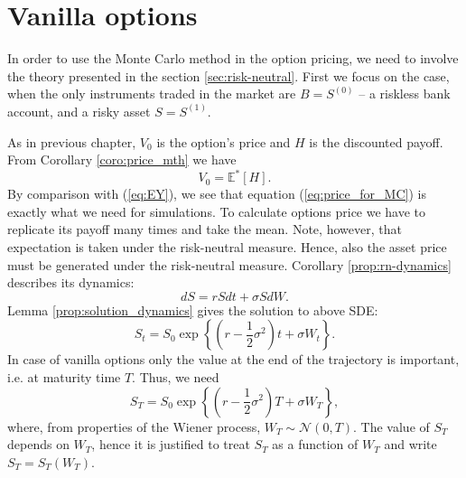 \documentclass[a4paper,11pt, twoside]{book}
\theoremstyle{definition}
\theoremstyle{remark}
\def\Em{{\mathbb{E}^*}}
\begin{document}
\section{Vanilla options}
\label{sec:pricing_vanilla}

In order to use the Monte Carlo method in the option pricing, we need to involve the theory presented in the section \ref{sec:risk-neutral}. First we focus on the case, when the only instruments traded in the market are $B = S^{(0)}$ -- a riskless bank account, and a risky asset $S = S^{(1)}$.

As in previous chapter, $V_0$ is the option's price and $H$ is the discounted payoff. From Corollary \ref{coro:price_mth} we have
\begin{equation}
 \label{eq:price_for_MC}
 V_0 = \Em[H].
\end{equation}
By comparison with (\ref{eq:EY}), we see that equation (\ref{eq:price_for_MC}) is exactly what we need for simulations. To calculate options price we have to replicate its payoff many times and take the mean. Note, however, that expectation is taken under the risk-neutral measure. Hence, also the asset price must be generated under the risk-neutral measure. Corollary \ref{prop:rn-dynamics} describes its dynamics:
\[ dS = rSdt + \sigma S dW. \]
Lemma \ref{prop:solution_dynamics} gives the solution to above SDE:
\begin{equation}
 \label{eq:vanilla_St}
 S_t = S_0 \exp\left\{ (r - \frac{1}{2}\sigma^2)t + \sigma W_t \right\}.
\end{equation}
In case of vanilla options only the value at the end of the trajectory is important, i.e. at maturity time $T$. Thus, we need
\begin{equation}
\label{eq:vanilla_ST}
 S_T = S_0 \exp\left\{ (r - \frac{1}{2}\sigma^2)T + \sigma W_T \right\},
\end{equation}
where, from properties of the Wiener process, $W_T \sim \mathcal{N}(0,T)$. The value of $S_T$ depends on $W_T$, hence it is justified to treat $S_T$ as a function of $W_T$ and write $S_T = S_T(W_T)$.
\end{document}
